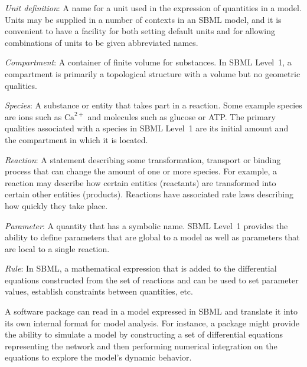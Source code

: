 \documentclass[10pt]{cekarticle}
\newcommand{\changed}[1]{\textcolor{BrickRed}{#1}}
\newenvironment{blockChanged}{\color{BrickRed}}{}
\begin{document}
\begin{description}
  
\item \emph{Unit definition}: A name for a unit used in the expression of
  quantities in a model.  Units may be supplied in a number of contexts in
  an SBML model, and it is convenient to have a facility for both setting
  default units and for allowing combinations of units to be given
  abbreviated names.

\item \emph{Compartment}: A container of finite volume for substances.  In
  SBML Level~1, a compartment is primarily a topological structure with a
  volume but no geometric qualities.
  
\item \emph{\changed{Species}}: A substance or entity that takes part in a reaction.
  Some example species are ions such as \changed{$\text{Ca}^{2+}$} and
  molecules such as glucose or ATP.  The primary qualities associated with
  a \changed{species} in SBML Level~1 are its initial amount and the compartment in
  which it is located.
  
\item \emph{Reaction}: A statement describing some transformation,
  transport or binding process that can change the amount of one or more
  species.  For example, a reaction may describe how certain entities
  (reactants) are transformed into certain other entities (products).
  Reactions have associated rate laws describing how quickly they take
  place.
  
\item \emph{Parameter}: A quantity that has a symbolic name.  SBML Level~1
  provides the ability to define parameters that are global to a model as
  well as parameters that are local to a single reaction.
  
\item \emph{Rule}: In SBML, a mathematical expression that is added
  to the differential equations constructed from the set of reactions and
  can be used to set parameter values, establish constraints between
  quantities, etc.

\end{description}

\begin{blockChanged}
A software package can read in a model expressed in SBML and translate it
into its own internal format for model analysis.  For instance, a package
might provide the ability to simulate a model by constructing a set of
differential equations representing the network and then performing
numerical integration on the equations to explore the model's dynamic
behavior.
\end{blockChanged}
\end{document}
